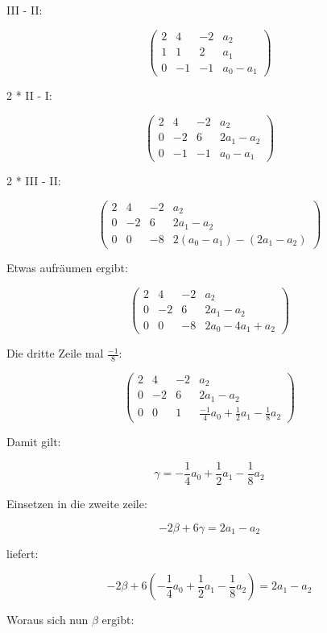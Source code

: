 \documentclass{article}
\begin{document}
III - II:

\[
\left (
\begin{array}{ccc|c}
  2 & 4 & -2 & a_{2} \\
  1 & 1 & 2 & a_{1} \\
  0 & -1 & -1 & a_{0} - a_{1}
\end{array}
\right )
\]

2 * II - I:

\[
\left (
\begin{array}{ccc|c}
  2 & 4 & -2 & a_{2} \\
  0 & -2 & 6 & 2a_{1} - a_{2} \\
  0 & -1 & -1 & a_{0} - a_{1}
\end{array}
\right )
\]

2 * III - II:

\[
\left (
\begin{array}{ccc|c}
  2 & 4 & -2 & a_{2} \\
  0 & -2 & 6 & 2a_{1} - a_{2} \\
  0 & 0 & -8 & 2(a_{0} - a_{1}) - (2a_{1} - a_{2})
\end{array}
\right )
\]

Etwas aufräumen ergibt:

\[
\left (
\begin{array}{ccc|c}
  2 & 4 & -2 & a_{2} \\
  0 & -2 & 6 & 2a_{1} - a_{2} \\
  0 & 0 & -8 & 2a_{0} - 4a_{1} + a_{2}
\end{array}
\right )
\]

Die dritte Zeile mal \(\frac{-1}{8}\):

\[
\left (
\begin{array}{ccc|c}
  2 & 4 & -2 & a_{2} \\
  0 & -2 & 6 & 2a_{1} - a_{2} \\
  0 & 0 & 1 & \frac{-1}{4}a_{0} + \frac{1}{2}a_{1} - \frac{1}{8}a_{2}
\end{array}
\right )
\]

Damit gilt:

\[
\gamma = -\frac{1}{4}a_{0} + \frac{1}{2}a_{1} - \frac{1}{8}a_{2}
\]

Einsetzen in die zweite zeile:

\[
-2\beta + 6\gamma = 2a_{1} - a_{2}
\]

liefert:

\[
-2\beta + 6(-\frac{1}{4}a_{0} + \frac{1}{2}a_{1} - \frac{1}{8}a_{2}) = 2a_{1} - a_{2}
\]

Woraus sich nun \(\beta\) ergibt:
\end{document}
